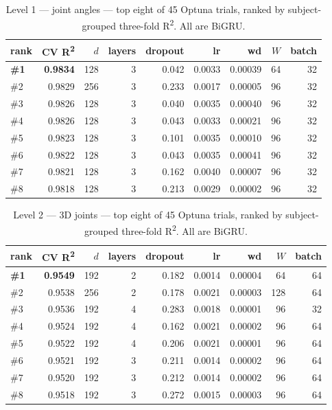 \begin{table}[H]
\centering
\caption{Level 1 --- joint angles --- top eight of 45 Optuna trials, ranked by subject-grouped three-fold R\textsuperscript{2}. All are BiGRU.}
\label{tab:app:sctrialsL1}
\scriptsize
\begin{tabular}{@{}lrrrrrrrr@{}}
\toprule
\textbf{rank} & \textbf{CV R\textsuperscript{2}} & \textbf{$d$} & \textbf{layers} & \textbf{dropout} & \textbf{lr} & \textbf{wd} & \textbf{$W$} & \textbf{batch} \\
\midrule
\textbf{\#1} & \textbf{0.9834} & 128 & 3 & 0.042 & 0.0033 & 0.00039 & 64 & 32 \\
\#2 & 0.9829 & 256 & 3 & 0.233 & 0.0017 & 0.00005 & 96 & 32 \\
\#3 & 0.9826 & 128 & 3 & 0.040 & 0.0035 & 0.00040 & 96 & 32 \\
\#4 & 0.9826 & 128 & 3 & 0.043 & 0.0033 & 0.00021 & 96 & 32 \\
\#5 & 0.9823 & 128 & 3 & 0.101 & 0.0035 & 0.00010 & 96 & 32 \\
\#6 & 0.9822 & 128 & 3 & 0.043 & 0.0035 & 0.00041 & 96 & 32 \\
\#7 & 0.9821 & 128 & 3 & 0.162 & 0.0040 & 0.00007 & 96 & 32 \\
\#8 & 0.9818 & 128 & 3 & 0.213 & 0.0029 & 0.00002 & 96 & 32 \\
\bottomrule
\end{tabular}
\end{table}

\begin{table}[H]
\centering
\caption{Level 2 --- 3D joints --- top eight of 45 Optuna trials, ranked by subject-grouped three-fold R\textsuperscript{2}. All are BiGRU.}
\label{tab:app:sctrialsL2}
\scriptsize
\begin{tabular}{@{}lrrrrrrrr@{}}
\toprule
\textbf{rank} & \textbf{CV R\textsuperscript{2}} & \textbf{$d$} & \textbf{layers} & \textbf{dropout} & \textbf{lr} & \textbf{wd} & \textbf{$W$} & \textbf{batch} \\
\midrule
\textbf{\#1} & \textbf{0.9549} & 192 & 2 & 0.182 & 0.0014 & 0.00004 & 64 & 64 \\
\#2 & 0.9538 & 256 & 2 & 0.178 & 0.0021 & 0.00003 & 128 & 64 \\
\#3 & 0.9536 & 192 & 4 & 0.283 & 0.0018 & 0.00001 & 96 & 32 \\
\#4 & 0.9524 & 192 & 4 & 0.162 & 0.0021 & 0.00002 & 96 & 64 \\
\#5 & 0.9522 & 192 & 4 & 0.206 & 0.0021 & 0.00001 & 96 & 64 \\
\#6 & 0.9521 & 192 & 3 & 0.211 & 0.0014 & 0.00002 & 96 & 64 \\
\#7 & 0.9520 & 192 & 3 & 0.212 & 0.0014 & 0.00002 & 96 & 64 \\
\#8 & 0.9518 & 192 & 3 & 0.272 & 0.0015 & 0.00003 & 96 & 64 \\
\bottomrule
\end{tabular}
\end{table}

